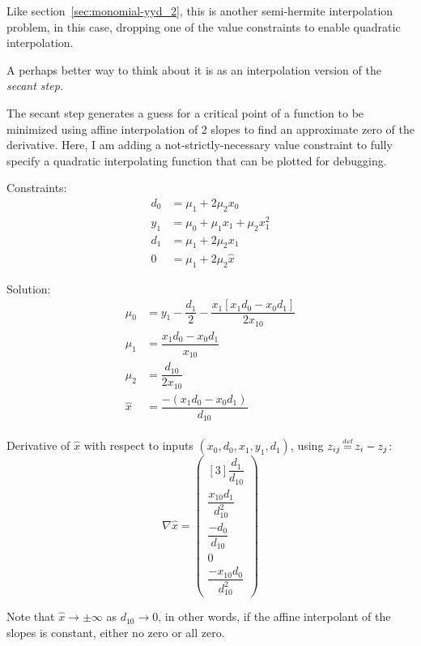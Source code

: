 \label{sec:monomial-dyd}

Like section~\ref{sec:monomial-yyd_2},
this is another semi-hermite interpolation problem,
in this case, dropping one of the value constraints to enable 
quadratic interpolation.

A perhaps better way to think about it is as an interpolation
version of the \textit{secant step.}

The secant step generates a guess for a critical point
of a function to be minimized using affine interpolation
of $2$ slopes to find an approximate zero of the derivative.
Here, I am adding a not-strictly-necessary value constraint 
to fully specify a quadratic interpolating function that can be 
plotted for debugging.

Constraints:
\begin{align}
d_0 & = \mu_1 + 2 \mu_2 x_0
\\
y_1 & = \mu_0 + \mu_1 x_1 + \mu_2 x_1^2
\nonumber
\\
d_1 & = \mu_1 + 2 \mu_2 x_1
\nonumber
\\
0 & = \mu_1 + 2 \mu_2 \hat{x}
\nonumber
\end{align}

Solution:
\begin{align}
\mu_0 & = 
y_1 
- 
\dfrac{d_1}{2}
-
\dfrac{x_1 \left[x_1 d_0 - x_0 d_1 \right]}{2 x_{10}}
\\
\mu_1 & =
\dfrac{x_1 d_0 - x_0 d_1}{x_{10}}
\nonumber
\\
\mu_2 & = \dfrac{d_{10}}{2 x_{10}}
\nonumber
\\
\hat{x} & = \dfrac{- \left( x_1 d_0 - x_0 d_1 \right)}{d_{10}}
\nonumber
\end{align}

Derivative of $\hat{x}$ with respect to inputs
$(x_0,d_0,x_1,y_1,d_1)$,
using $z_{ij} \operatorname*{\overset{\underset{\mathrm{def}}{}}{=}} z_i - z_j$:
\begin{equation}
\nabla \hat{x} =
\begin{pmatrix}[3]
\dfrac{d_1}{d_{10}}
\\
\dfrac{ x_{10} d_1}{d_{10}^{2}}
\\
\dfrac{- d_0}{d_{10}}
\\
0
\\
\dfrac{- x_{10} d_0}{d_{10}^{2}
}
\end{pmatrix}
\end{equation}
 
Note that $\hat{x} \to \pm \infty$ as $d_{10} \to 0$,
in other words,
if the affine interpolant of the slopes is constant,
either no zero or all zero.

